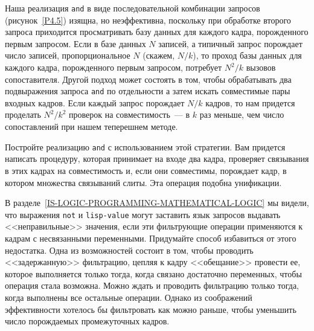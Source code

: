 \begin{exercise}{4.76}%
\label{EX4.76}%
%
%
Наша реализация {\tt and} в виде 
последовательной
комбинации запросов (рисунок~\ref{P4.5}) изящна, но
неэффективна, поскольку при обработке второго запроса приходится
просматривать базу данных для каждого кадра, порожденного первым
запросом.  Если в базе данных $N$ записей, а типичный
запрос порождает число записей, пропорциональное $N$
(скажем, $N/k$), то проход базы данных для каждого кадра,
порожденного первым запросом, потребует $N^2/k$ вызовов
сопоставителя.  Другой подход может состоять в том, чтобы обрабатывать
два подвыражения запроса {\tt and} по отдельности а затем
искать совместимые пары входных кадров.  Если каждый запрос порождает
$N/k$ кадров, то нам придется проделать
$N^2/k^2$ проверок на совместимость~--- в $k$ раз
меньше, чем число сопоставлений при нашем теперешнем методе.

Постройте реализацию {\tt and} с использованием
этой стратегии.  Вам придется написать процедуру, которая принимает
на входе два кадра, проверяет связывания в этих кадрах на
совместимость и, если они совместимы, порождает кадр, в котором
множества связываний слиты.  Эта операция подобна унификации.
\end{exercise}

\begin{exercise}{4.77}%
\label{EX4.77}%
В 
разделе~\ref{IS-LOGIC-PROGRAMMING-MATHEMATICAL-LOGIC} мы видели,
что выражения {\tt not} и {\tt lisp-value}
могут заставить язык запросов выдавать <<неправильные>> значения, если эти
фильтрующие операции применяются к кадрам с несвязанными переменными.
Придумайте способ избавиться от этого недостатка.  Одна из
возможностей состоит в том, чтобы проводить <<задержанную>>
фильтрацию, цепляя к кадру <<обещание>> провести ее, которое
выполняется только тогда, когда связано достаточно переменных, чтобы
операция стала возможна.  Можно ждать и проводить фильтрацию только
тогда, когда выполнены все остальные операции.  Однако из соображений
эффективности хотелось бы фильтровать как можно раньше, чтобы
уменьшить число порождаемых промежуточных кадров.
\end{exercise}

